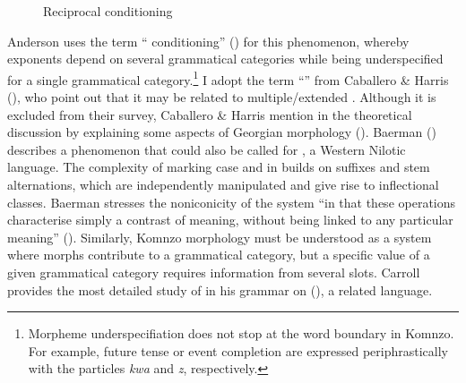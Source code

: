 \begin{figure}
\begin{center}
\end{center}
\caption{Reciprocal conditioning}\label{recipfath}
\end{figure}%

Anderson uses the term `` conditioning'' (\citeyear[55]{Anderson:1992uw}) for this phenomenon, whereby exponents depend on several grammatical categories while being underspecified for a single grammatical category.\footnote{Morpheme underspecifiation does not stop at the word boundary in Komnzo. For example, future tense or event completion are expressed periphrastically with the particles \emph{kwa} and \emph{z}, respectively.} I adopt the term ``'' from Caballero \& Harris (\citeyear[170]{Caballero:2012vr}), who point out that it may be related to multiple/extended . Although it is excluded from their survey, Caballero \& Harris mention  in the theoretical discussion by explaining some aspects of Georgian  morphology (\citealt{Gurevich2006:geo}). Baerman (\citeyear{Baerman:2012ko}) describes a phenomenon that could also be called  for , a Western Nilotic language. The complexity of marking case and  in  builds on suffixes and stem alternations, which are independently manipulated and give rise to inflectional classes. Baerman stresses the noniconicity of the system ``in that these operations characterise simply a contrast of meaning, without being linked to any particular meaning'' (\citeyear[490]{Baerman:2012ko}). Similarly, Komnzo  morphology must be understood as a system where morphs contribute to a grammatical category, but a specific value of a given grammatical category requires information from several slots. Carroll provides the most detailed study of  in his grammar on  (\citeyear{Carroll:Ngkolmpu}), a related  language.


